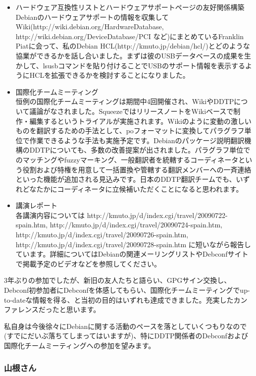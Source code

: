 \documentclass[mingoth,a4paper]{jsarticle}
\begin{document}
\begin{itemize}
\item ハードウェア互換性リストとハードウェアサポートページの友好関係構築\\
  Debianのハードウェアサポートの情報を収集してWiki(http://wiki.debian.org/HardwareDatabase, http://wiki.debian.org/DeviceDatabase/PCI など)にまとめているFranklin Piatに会って、私のDebian HCL(http://kmuto.jp/debian/hcl/)とどのような協業ができるかを話し合いました。まずは彼のUSBデータベースの成果を生かして、lsusbコマンドを貼り付けることでUSBのサポート情報を表示するようにHCLを拡張できるかを検討することになりました。
\item 国際化チームミーティング\\
  恒例の国際化チームミーティングは期間中4回開催され、WikiやDDTPについて議論がなされました。SqueezeではリリースノートをWikiベースで制作・編集するというトライアルが実施されます。Wikiのように変動の激しいものを翻訳するための手法として、poフォーマットに変換してパラグラフ単位で作業できるような手法も実施予定です。Debianのパッケージ説明翻訳機構のDDTPについても、多数の改善提案が出されました。パラグラフ単位でのマッチングやfuzzyマーキング、一般翻訳者を統轄するコーディネータという役割および特権を用意して一括置換や管轄する翻訳メンバーへの一斉連絡といった機能が追加される見込みです。日本のDDTP翻訳チームでも、いずれどなたかにコーディネータに立候補いただくことになると思われます。
\item 講演レポート\\
  各講演内容については
  http://kmuto.jp/d/index.cgi/travel/20090722-spain.htm,
  http://kmuto.jp/d/index.cgi/travel/20090724-spain.htm,
  http://kmuto.jp/d/index.cgi/travel/20090726-spain.htm,
  http://kmuto.jp/d/index.cgi/travel/20090728-spain.htm
  に短いながら報告しています。詳細についてはDebianの関連メーリングリストやDebconfサイトで掲載予定のビデオなどを参照してください。
\end{itemize}

3年ぶりの参加でしたが、新旧の友人たちと語らい、GPGサイン交換し、Debconf初参加者にDebconfを体感してもらい、国際化チームミーティングでup-to-dateな情報を得る、と当初の目的はいずれも達成できました。充実したカンファレンスだったと思います。

私自身は今後徐々にDebianに関する活動のペースを落としていくつもりなので(すでにだいぶ落ちてしまってはいますが)、特にDDTP関係者のDebconfおよび国際化チームミーティングへの参加を望みます。

\subsubsection{山根さん}
\end{document}

